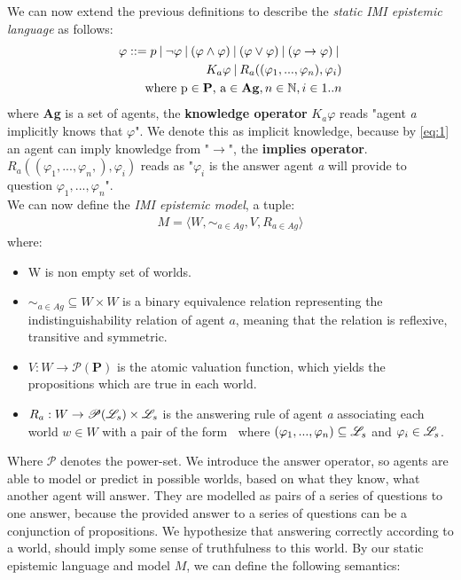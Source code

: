 We can now extend the previous definitions to describe the \textit{static IMI
    epistemic language} \staticlang\: as follows:
\begin{align}
    \begin{split}
        \varphi ::= p \:|\:\neg\varphi\:|\:(\varphi \land \varphi) \:|\: (\varphi \lor \varphi) \:|\: (\varphi \rightarrow \varphi) \:|\: \\K_a\varphi \:|\: R_a((\varphi_1,...,\varphi_n), \varphi_i) \\ \text{where p} \in \text{\textbf{P}}\text{, a} \in \text{\textbf{Ag}}, n \in \mathbb{N}, i \in 1..n \label{eq:2}
    \end{split}
\end{align}
where \textbf{Ag} is a set of agents, the \textbf{knowledge operator} $K_a\varphi$ reads "agent \textit{a} implicitly knows that $\varphi$". We denote this as implicit knowledge, because by \cref{eq:1} an agent can imply knowledge from "$\rightarrow$", the \textbf{implies operator}. $R_a((\varphi_1,...,\varphi_n,), \varphi_i)$ reads as "$\varphi_i$ is the answer agent \textit{a} will provide to question $\varphi_1,...,\varphi_n$". \\

We can now define the \textit{IMI epistemic model}, a tuple:
\begin{align}
    M = \langle W, \sim_{a\in Ag}, V, R_{a\in Ag}\rangle \label{eq:3}
\end{align}
where:
\begin{itemize}
    \setlength\itemsep{-0.4em}
    \item W is non empty set of worlds.
    \item $\sim_{a\in Ag} \subseteq W \times W$ is a binary equivalence relation representing the indistinguishability relation of agent $a$, meaning that the relation is reflexive, transitive and symmetric.
    \item $V : W \rightarrow \mathscr{P}(\mathbf{P})$ is the atomic valuation function, which yields the propositions which are true in each world.
    \item $R_a : W \rightarrow \mathscr{P}(\mathscr{L}_s) \times \mathscr{L}_s$ is the answering \newline rule of agent \textit{a} associating each world $w \in W$ with a pair of the form \aset $\:$ where $(\varphi_1,...,\varphi_n) \subseteq \mathscr{L}_s$ and $\varphi_i \in \mathscr{L}_s$.
\end{itemize}
Where $\mathscr{P}$ denotes the power-set. We introduce the answer operator, so agents are able to model or predict in possible worlds, based on what they know, what another agent will answer. They are modelled as pairs of a series of questions to one answer, because the provided answer to a series of questions can be a conjunction of propositions. We hypothesize that answering correctly according to a world, should imply some sense of truthfulness to this world. By our static epistemic language \staticlang\: and model $M$, we can define the following semantics:

